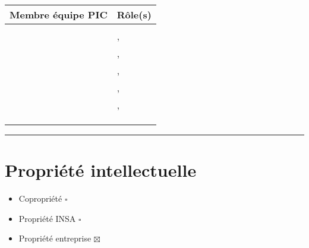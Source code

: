 	
	\begin{tabular}[h]{|p{}|p{}|}
	\hline
	
	Membre équipe PIC & Rôle(s) \\\hline
	\Sergi & \CP \\\hline
	\Pierre & \CPA , \RQ \\\hline
	\Michel & \D , \RD \\\hline 
	\Kafui  & \D , \RQA \\\hline
	\Matthieu & \D , \RRS \\\hline
	\Mathieu & \D , \RGC \\\hline
	\Melissa  & \D \\\hline
	\Julie & \D \\\hline
	\Florian & \D \\\hline
	
\end{tabular}
	
	\vspace{1cm}
	\noindent\hfil\rule{\textwidth}{.4pt}\hfil
	\vspace{1cm}	
	
	\section*{Propriété intellectuelle}
		\begin{itemize}
			\item Copropriété $\square$
			\item Propriété INSA $\square$
			\item Propriété entreprise $\boxtimes$
		\end{itemize}
	
		
